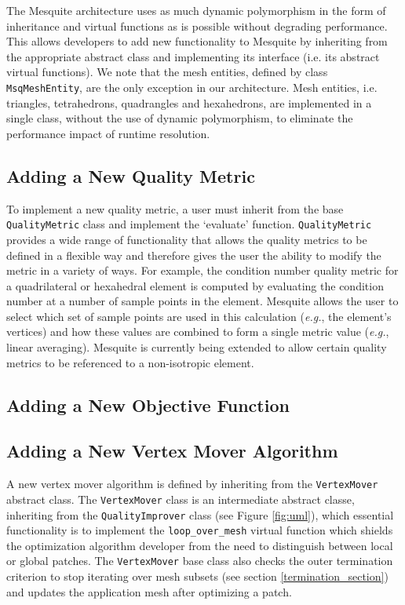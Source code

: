\documentclass[letter]{report}
\begin{document}
The Mesquite architecture uses as much dynamic polymorphism in the
form of inheritance and virtual functions as is possible without
degrading performance.  This allows developers to add new
functionality to Mesquite by inheriting from the appropriate abstract
class and implementing its interface (i.e. its abstract virtual
functions).  We note that the mesh entities, defined by class {\tt
MsqMeshEntity}, are the only exception in our architecture.  Mesh
entities, i.e. triangles, tetrahedrons, quadrangles and hexahedrons,
are implemented in a single class, without the use of dynamic
polymorphism, to eliminate the performance impact of runtime
resolution.

\subsection{Adding a New Quality Metric}

To implement a new quality metric, a user must inherit from the base
{\tt QualityMetric} class and implement the `evaluate' function.
{\tt QualityMetric} provides a wide range of
functionality that allows the quality metrics to be defined in a
flexible way and therefore gives the user the ability to modify the
metric in a variety of ways.  For example, the condition number
quality metric for a quadrilateral or hexahedral element is computed
by evaluating the condition number at a number of sample points in the
element.  Mesquite allows the user to select which set of sample
points are used in this calculation ({\it e.g.}, the element's
vertices) and how these values are combined to form a single metric
value ({\it e.g.}, linear averaging).  Mesquite is currently being
extended to allow certain quality metrics to be referenced to a
non-isotropic element.

\subsection{Adding a New Objective Function}

\subsection{Adding a New Vertex Mover Algorithm}

A new vertex mover algorithm is defined by inheriting from the
\texttt{VertexMover} abstract class. The \texttt{VertexMover} class 
is an intermediate abstract classe, inheriting from the
\texttt{QualityImprover} class (see Figure \ref{fig:uml}),  which
essential functionality is to implement the \texttt{loop\_over\_mesh}
virtual function which shields the optimization algorithm developer
from the need to distinguish between local or global patches.  The
{\tt VertexMover} base class also checks the outer termination
criterion to stop iterating over mesh subsets (see section
\ref{termination_section}) and updates the application mesh after
optimizing a patch.
\end{document}
